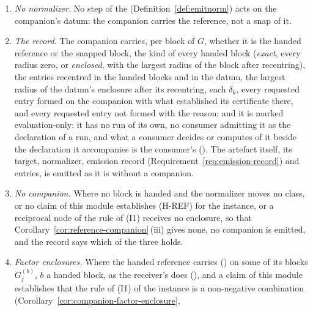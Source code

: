 \begin{requirement}
\begin{enumerate}[label=(\roman*),leftmargin=2.4em]
  $\hat O_k$ itself and is emitted as it is, an equality included. Each
  emitted entry carries the certificate case of the entry it relaxes, its
  $\delta_k$, and the mark that it is relaxed, its certificate being
  Lemma~\ref{lem:row-relaxation}\,(ii); its operator is added to the
  companion's transported set with its pull-back. The lattice condition of
  Requirement~\ref{req:licensed-entry-lattice} binds the artefact's own
  entries and not these.
\item \emph{No normalizer.} No step of the 
  (Definition~\ref{def:emitnorm}) acts on the companion's datum: the
  companion carries the reference, not a snap of it.
\item \emph{The record.} The companion carries, per block of $G$, whether
  it is the handed reference or the snapped block, the kind of every handed
  block (\emph{exact}, every radius zero, or \emph{enclosed}, with the
  largest radius of the block after recentring), the entries recentred in
  the handed blocks and in the datum, the largest radius of the datum's
  enclosure after its recentring, each $\delta_k$, every requested entry
  formed on the companion with what established its certificate there, and
  every requested entry not formed with the reason; and it is
  marked evaluation-only: it has no run of its own, no consumer admitting
  it as the declaration of a run, and what a consumer decides or computes
  of it beside the declaration it accompanies is the consumer's
  (). The artefact
  itself, its target, normalizer, emission record
  (Requirement~\ref{req:emission-record}) and entries, is emitted as it is
  without a companion.
\item \emph{No companion.} Where no block is handed and the normalizer
  moves no class, or no claim of this module establishes (H-REF) for the
  instance, or a reciprocal node of the rule of (I1) receives no enclosure,
  so that Corollary~\ref{cor:reference-companion}\,(iii) gives none, no
  companion is emitted, and the record says which of the three holds.
\item \emph{Factor enclosures.} Where the handed reference carries
  () on some of its blocks
  $G^{(b)}_j$, $b$ a handed block, as the receiver's does
  (), and a
  claim of this module establishes that the rule of (I1) of the instance is a
  non-negative combination (Corollary~\ref{cor:companion-factor-enclosure},

\end{enumerate}
\end{requirement}
